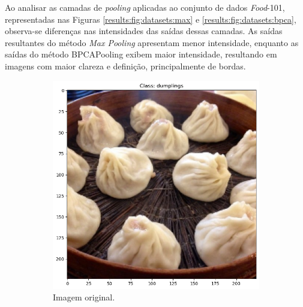 Ao analisar as camadas de \textit{pooling} aplicadas ao conjunto de dados \textit{Food}-101, representadas nas Figuras \ref{results:fig:datasets:max} e \ref{results:fig:datasets:bpca}, observa-se diferenças nas intensidades das saídas dessas camadas. As saídas resultantes do método \textit{Max Pooling} apresentam menor intensidade, enquanto as saídas do método BPCAPooling exibem maior intensidade, resultando em imagens com maior clareza e definição, principalmente de bordas.

\begin{figure}[p]
    \caption{Resultado visual de camadas de \textit{pooling} do conjunto \textit{Food}-101. Camadas com \textit{Max Pooling}.}
    \centering
    \label{results:fig:datasets:max}
     \begin{subfigure}[t]{0.45\textwidth}
         \centering
         \includegraphics[width=1\linewidth]{recursos/imagens/results/original.png}
         \caption{Imagem original.}
         \label{results:fig:datasets:max_original}
     \end{subfigure}%
     ~ 
     \begin{subfigure}[t]{0.45\textwidth}
         \centering

\end{subfigure}
\end{figure}
